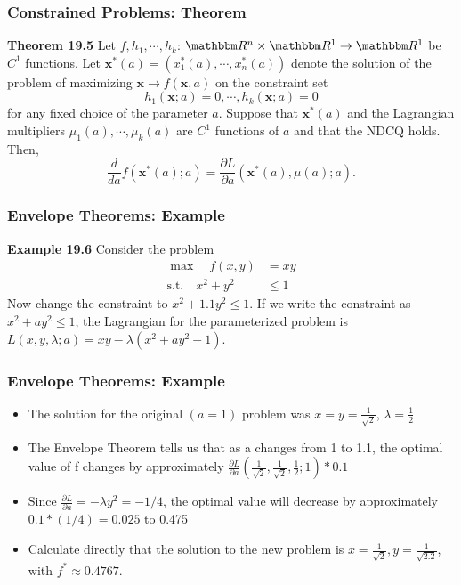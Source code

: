 \documentclass[9pt,aspectratio=169]{beamer}
\newcommand{\RR}{\mathbbm R}
\begin{document}
\begin{frame}
	\frametitle{Constrained Problems: Theorem}
    \begin{block}{\textbf{Theorem 19.5}}
        Let $f,h_1,\cdots,h_k$: $\RR^n \times \RR^1\rightarrow \RR^1$ be $C^1$
        functions. Let $\mathbf{x^*}(a) = (x_1^*(a),\cdots,x_n^*(a))$ denote
        the solution of the problem of maximizing $\mathbf{x}\rightarrow
        f(\mathbf{x},a)$ on the constraint set
        $$h_1(\mathbf{x}; a) = 0,\cdots, h_k(\mathbf{x}; a) = 0$$
        for any fixed choice of the parameter $a$. Suppose that
        $\mathbf{x^*}(a)$ and the Lagrangian multipliers
        $\mu_1(a),\cdots,\mu_k(a)$ are $C^1$ functions of $a$ and that the
        NDCQ holds. Then,
        $$\frac{d}{da}f(\mathbf{x^*}(a); a) = \frac{\partial L}{\partial
          a}(\mathbf{x^*}(a),\mu(a); a).$$
    \end{block}
	
\end{frame}	


\begin{frame}
	\frametitle{Envelope Theorems: Example} \textbf{Example 19.6} Consider
    the problem
	\begin{align}
	\max \quad f(x,y) & = xy \nonumber \\ 
	\text{s.t.}\quad x^2+y^2 &\leq 1 \nonumber 
	\end{align}
    Now change the constraint to $x^2+1.1y^2 \leq 1$. If we write the
    constraint as $x^2+ay^2 \leq 1$, the Lagrangian for the parameterized
    problem is $L(x,y,\lambda;a) = xy-\lambda(x^2+ay^2-1)$.
\end{frame}


\begin{frame}
    \frametitle{Envelope Theorems: Example}
    \begin{itemize}
        \item The solution for the original $(a=1)$ problem was
        $x=y=\frac{1}{\sqrt{2}}$, $\lambda = \frac{1}{2}$
        \item The Envelope Theorem tells us that as a changes from 1 to 1.1,
        the optimal value of f changes by approximately $\frac{\partial
          L}{\partial
          a}\left(\frac{1}{\sqrt{2}},\frac{1}{\sqrt{2}},\frac{1}{2};1\right)*0.1$
        \item Since $\frac{\partial L}{\partial a} = -\lambda y^2 = -1/4$,
        the optimal value will decrease by approximately $0.1*(1/4) = 0.025$
        to 0.475
        \item Calculate directly that the solution to the new problem is
        $x=\frac{1}{\sqrt{2}}, y=\frac{1}{\sqrt{2.2}}$, with $f^*\approx
        0.4767$.
    \end{itemize}

\end{frame}
\end{document}
